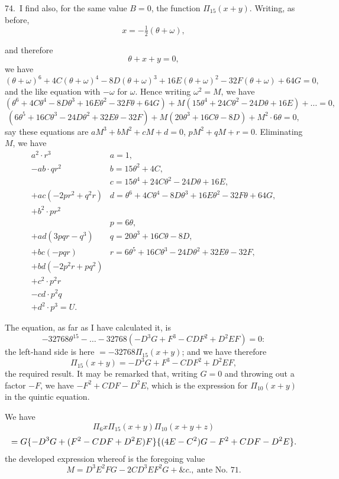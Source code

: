 \documentclass[11pt]{article}
\begin{document}
74.\ I find also, for the same value $B = 0$, the function $\Pi_{15}(x + y)$. Writing, as before,
\[
x = -\tfrac{1}{2}(\theta + \omega),
\]

\clearpage
and therefore
\[
\theta + x + y = 0,
\]
we have
\[
(\theta + \omega)^6 + 4C(\theta + \omega)^4 - 8D(\theta + \omega)^3 + 16E(\theta + \omega)^2 - 32F(\theta + \omega) + 64G = 0,
\]
and the like equation with $-\omega$ for $\omega$. Hence writing $\omega^2 = M$, we have
\[
(\theta^6 + 4C\theta^4 - 8D\theta^3 + 16E\theta^2 - 32F\theta + 64G) + M(15\theta^4 + 24C\theta^2 - 24D\theta + 16E) + \ldots = 0,
\]
\[
(6\theta^5 + 16C\theta^3 - 24D\theta^2 + 32E\theta - 32F) + M(20\theta^3 + 16C\theta - 8D) + M^2 \cdot 6\theta = 0,
\]
say these equations are $aM^3 + bM^2 + cM + d = 0$, $pM^2 + qM + r = 0$. Eliminating $M$, we have
\[
\begin{array}{ll}
a^2 \cdot r^3 & a = 1, \\
- ab \cdot qr^2 & b = 15\theta^2 + 4C, \\
& c = 15\theta^4 + 24C\theta^2 - 24D\theta + 16E, \\
+ ac (-2pr^2 + q^2r) & d = \theta^6 + 4C\theta^4 - 8D\theta^3 + 16E\theta^2 - 32F\theta + 64G, \\
+ b^2 \cdot pr^2 & \\
& p = 6\theta, \\
+ ad (3pqr - q^3) & q = 20\theta^3 + 16C\theta - 8D, \\
+ bc (-pqr) & r = 6\theta^5 + 16C\theta^3 - 24D\theta^2 + 32E\theta - 32F, \\
+ bd (-2p^2r + pq^2) & \\
+ c^2 \cdot p^2r & \\
- cd \cdot p^2q & \\
+ d^2 \cdot p^3 = U. &
\end{array}
\]

The equation, as far as I have calculated it, is
\[
-32768\theta^{15} - \ldots - 32768(-D^3G + F^3 - CDF^2 + D^2EF) = 0:
\]
the left-hand side is here $= -32768\Pi_{15}(x + y)$; and we have therefore
\[
\Pi_{15}(x + y) = -D^3G + F^3 - CDF^2 + D^2EF,
\]
the required result. It may be remarked that, writing $G = 0$ and throwing out a factor $-F$, we have $-F^2 + CDF - D^2E$, which is the expression for $\Pi_{10}(x + y)$ in the quintic equation.

We have
\[
\Pi_6 x \Pi_{15}(x + y) \Pi_{10}(x + y + z)
\]
\[
\resizebox{\textwidth}{!}{$\displaystyle
= G\{-D^3G + (F^2 - CDF + D^2E)F\} \{(4E - C^2)G - F^2 + CDF - D^2E\}.
$}
\]
the developed expression whereof is the foregoing value
\[
M = D^3E^2FG - 2CD^3EF^2G + \&c.,\ \text{ante No.\ 71.}
\]
\end{document}
